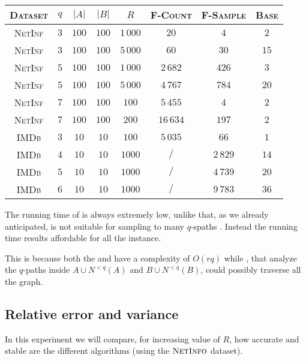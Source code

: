 	
	\begin{table}[h]
		\centering
		\label{my-label}
		\begin{tabular}{|c|c|c|c|c|c|c|c|}
			\hline
			\textsc{Dataset}       & $q$  & $|A|$ & $|B|$ & $R$ & \textsc{F-Count} & \textsc{F-Sample} & \textsc{Base} \\ \hline
			\textsc{NetInf} & $3$  & $100$ & $100$ & $1\,000$ & $20$ & $4$ & $2$ \\ \hline
			\textsc{NetInf} & $3$  & $100$ & $100$ & $5\,000$ & $60$ & $30$ & $15$ \\ \hline
			\textsc{NetInf} & $5$  & $100$ & $100$ & $1\,000$ & $2\,682$ & $426$ & $3$ \\ \hline
			\textsc{NetInf} & $5$  & $100$ & $100$ & $5\,000$ & $4\,767$ & $784$ & $20$ \\ \hline
			\textsc{NetInf} & $7$  & $100$ & $100$ & $100$ & $5\,455$ & $4$ & $2$ \\ \hline
			\textsc{NetInf} & $7$  & $100$ & $100$ & $200$ & $16\,634$ & $197$ & $2$ \\ \hline
			\textsc{IMDb}   & $3$  & $10$ & $10$ & $100$ & $5\,035$ & $66$ & $1$ \\ \hline
			\textsc{IMDb}   & $4$  & $10$ & $10$ & $1000$ & $/$ & $2\,829$ & $14$ \\ \hline
			\textsc{IMDb}   & $5$  & $10$ & $10$ & $1000$ & $/$ & $4\,739$ & $20$ \\ \hline
			\textsc{IMDb}   & $6$  & $10$ & $10$ & $1000$ & $/$ & $9\,783$ & $36$ \\ \hline
			
		\end{tabular}
	\end{table}
	
	The running time of \base is always extremely low, 
	unlike \fcount that, as we already anticipated, is not suitable for sampling to many $q$-spaths .
	Instead the running time \fsamp results affordable for all the instance. 
	
	This is because both the \fsamp and \base have a complexity of $O(rq)$ while 
	\fcount, that analyze the $q$-paths inside $A \cup N^{<q}(A)$ and $B \cup N^{<q}(B)$, could possibly traverse all the graph.
	 
	\subsection*{Relative error and variance}
	
	In this experiment we will compare, for increasing value of $R$, how accurate and stable are the different algorithms (using the $\textsc{NetInfo}$ dataset).\\
		
